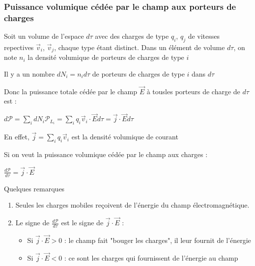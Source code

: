 \documentclass[a4paper,12pt]{book}
\begin{document}
\subsubsection{Puissance volumique cédée par le champ aux porteurs de charges}
Soit un volume de l'espace $d\tau$ avec des charges de type $q_i$, $q_j$ de vitesses repectives $\vec{v}_i$, $\vec{v}_j$, chaque type étant distinct. Dans un élément de volume $d\tau$, on note $n_i$ la densité volumique de porteurs de charges de type $i$
\par Il y a un nombre $dN_i=n_id\tau$ de porteurs de charges de type $i$ dans $d\tau$ \par Donc la puissance totale cédée par le champ $\vec{E}$ à tousles porteurs de charge de $d\tau$ est : \par $d\mathcal{P}=\sum\limits_i dN_i\mathcal{P}_{L_i} = \sum\limits_i q_i\vec{v}_i\cdot\vec{E}d\tau = \vec{j}\cdot\vec{E}d\tau$ \par En effet, $\vec{j}=\sum\limits_i q_i\vec{v}_i$ est la densité volumique de courant
\par Si on veut la puissance volumique cédée par le champ aux charges : \par $\frac{d\mathcal{P}}{d\tau}=\vec{j}\cdot\vec{E}$
\par Quelques remarques \begin{enumerate}
\item Seules les charges mobiles reçoivent de l'énergie du champ électromagnétique.
\item Le signe de $\frac{d\mathcal{P}}{d\tau}$ est le signe de $\vec{j}\cdot\vec{E}$ :\begin{itemize} \item  Si $\vec{j}\cdot\vec{E}>0$ : le champ fait "bouger les charges", il leur fournit de l'énergie \item Si $\vec{j}\cdot\vec{E}<0$ : ce sont les charges qui fournissent de l'énergie au champ\end{itemize} 
\end{enumerate}
\end{document}
